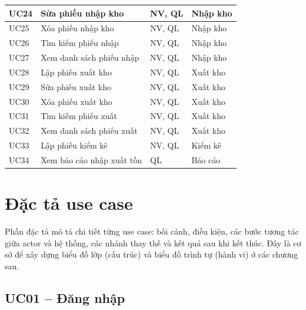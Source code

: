 \begin{longtable}{|p{1.1cm}|p{4.8cm}|p{3.2cm}|p{3.5cm}|}
\hline
UC24 & Sửa phiếu nhập kho & NV, QL & Nhập kho \\
\hline
UC25 & Xóa phiếu nhập kho & NV, QL & Nhập kho \\
\hline
UC26 & Tìm kiếm phiếu nhập & NV, QL & Nhập kho \\
\hline
UC27 & Xem danh sách phiếu nhập & NV, QL & Nhập kho \\
\hline
UC28 & Lập phiếu xuất kho & NV, QL & Xuất kho \\
\hline
UC29 & Sửa phiếu xuất kho & NV, QL & Xuất kho \\
\hline
UC30 & Xóa phiếu xuất kho & NV, QL & Xuất kho \\
\hline
UC31 & Tìm kiếm phiếu xuất & NV, QL & Xuất kho \\
\hline
UC32 & Xem danh sách phiếu xuất & NV, QL & Xuất kho \\
\hline
UC33 & Lập phiếu kiểm kê & NV, QL & Kiểm kê \\
\hline
UC34 & Xem báo cáo nhập xuất tồn & QL & Báo cáo \\
\hline
\end{longtable}

\section{Đặc tả use case}

Phần đặc tả mô tả chi tiết từng use case: bối cảnh, điều kiện, các bước tương tác giữa actor và hệ thống, các nhánh thay thế và kết quả sau khi kết thúc. Đây là cơ sở để xây dựng biểu đồ lớp (cấu trúc) và biểu đồ trình tự (hành vi) ở các chương sau.

\subsection{UC01 -- Đăng nhập}

